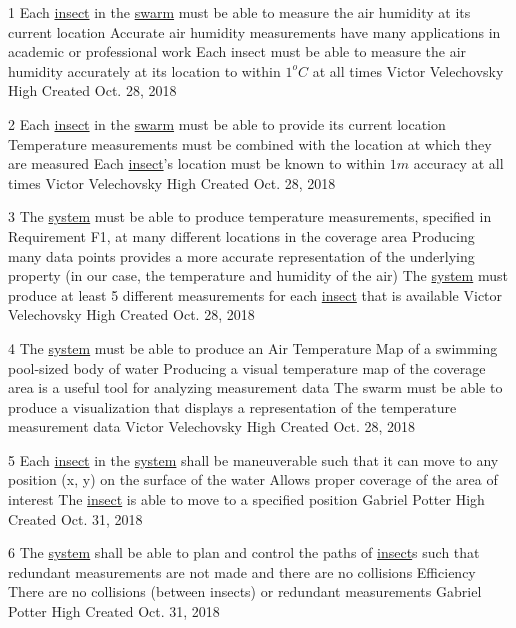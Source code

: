 \documentclass[11pt]{article}
\begin{document}
\functionalRequirement
{1}
{Each \hyperref[sec:definitions]{insect} in the
\hyperref[sec:definitions]{swarm}
must be able to measure
the air humidity at its current location}
{Accurate air humidity measurements have many applications
in academic or professional work}
{Each insect must be able to measure the air humidity accurately at its location
to within \pm $ 1^o C$ at all times}
{Victor Velechovsky}
{High}
{Created Oct. 28, 2018}

\functionalRequirement
{2}
{Each \hyperref[sec:definitions]{insect} in the
\hyperref[sec:definitions]{swarm}
must be able to provide its current location}
{Temperature measurements must be combined with the location
at which they are measured}
{Each \hyperref[sec:definitions]{insect}'s location must be known to within
$1m$ accuracy at all times}
{Victor Velechovsky}
{High}
{Created Oct. 28, 2018}

\functionalRequirement
{3}
{The \hyperref[sec:definitions]{system} must be able to produce temperature
measurements, specified in Requirement F1, at many different locations
in the coverage area}
{Producing many data points provides a more accurate representation of the
underlying property (in our case, the temperature and humidity of the air)}
{The \hyperref[sec:definitions]{system} must produce at least 5 different
measurements for each \hyperref[sec:definitions]{insect} that is
available}
{Victor Velechovsky}
{High}
{Created Oct. 28, 2018}

\functionalRequirement
{4}
{The \hyperref[sec:definitions]{system} must be able to produce an Air Temperature Map of a swimming pool-sized body of water}
{Producing a visual temperature map of the coverage area is a useful
tool for analyzing measurement data}
{The swarm must be able to produce a visualization that displays a representation
of the temperature measurement data}
{Victor Velechovsky}
{High}
{Created Oct. 28, 2018}

\functionalRequirement
{5}
{Each \hyperref[sec:definitions]{insect} in the \hyperref[sec:definitions]{system} shall be maneuverable such that it can move to any position (x, y) on the surface of the water}
{Allows proper coverage of the area of interest}
{The \hyperref[sec:definitions]{insect} is able to move to a specified position}
{Gabriel Potter}
{High}
{Created Oct. 31, 2018}

\functionalRequirement
{6}
{The \hyperref[sec:definitions]{system} shall be able to plan and control the paths of \hyperref[sec:definitions]{insect}s such that redundant measurements are not made and there are no collisions}
{Efficiency}
{There are no collisions (between insects) or redundant measurements}
{Gabriel Potter}
{High}
{Created Oct. 31, 2018}
\end{document}
